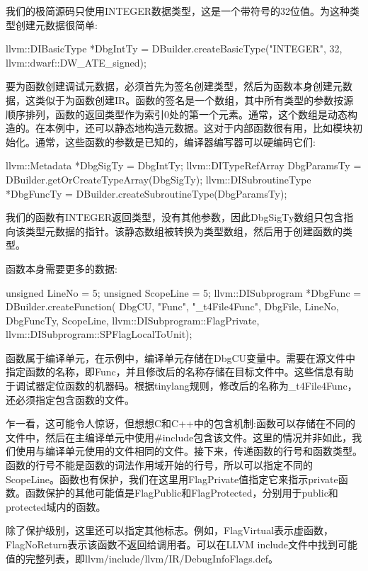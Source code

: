 我们的极简源码只使用INTEGER数据类型，这是一个带符号的32位值。为这种类型创建元数据很简单:

\begin{cpp}
llvm::DIBasicType *DbgIntTy =
    DBuilder.createBasicType("INTEGER", 32,
        llvm::dwarf::DW_ATE_signed);
\end{cpp}

要为函数创建调试元数据，必须首先为签名创建类型，然后为函数本身创建元数据，这类似于为函数创建IR。函数的签名是一个数组，其中所有类型的参数按源顺序排列，函数的返回类型作为索引0处的第一个元素。通常，这个数组是动态构造的。在本例中，还可以静态地构造元数据。这对于内部函数很有用，比如模块初始化。通常，这些函数的参数是已知的，编译器编写器可以硬编码它们:

\begin{cpp}
llvm::Metadata *DbgSigTy = {DbgIntTy};
llvm::DITypeRefArray DbgParamsTy =
            DBuilder.getOrCreateTypeArray(DbgSigTy);
llvm::DISubroutineType *DbgFuncTy =
            DBuilder.createSubroutineType(DbgParamsTy);
\end{cpp}

我们的函数有INTEGER返回类型，没有其他参数，因此DbgSigTy数组只包含指向该类型元数据的指针。该静态数组被转换为类型数组，然后用于创建函数的类型。

函数本身需要更多的数据:

\begin{cpp}
unsigned LineNo = 5;
unsigned ScopeLine = 5;
llvm::DISubprogram *DbgFunc = DBuilder.createFunction(
    DbgCU, "Func", "_t4File4Func", DbgFile, LineNo,
    DbgFuncTy, ScopeLine, llvm::DISubprogram::FlagPrivate,
    llvm::DISubprogram::SPFlagLocalToUnit);
\end{cpp}

函数属于编译单元，在示例中，编译单元存储在DbgCU变量中。需要在源文件中指定函数的名称，即Func，并且修改后的名称存储在目标文件中。这些信息有助于调试器定位函数的机器码。根据tinylang规则，修改后的名称为\_t4File4Func，还必须指定包含函数的文件。

乍一看，这可能令人惊讶，但想想C和C++中的包含机制:函数可以存储在不同的文件中，然后在主编译单元中使用\#include包含该文件。这里的情况并非如此，我们使用与编译单元使用的文件相同的文件。接下来，传递函数的行号和函数类型。函数的行号不能是函数的词法作用域开始的行号，所以可以指定不同的ScopeLine。函数也有保护，我们在这里用FlagPrivate值指定它来指示private函数。函数保护的其他可能值是FlagPublic和FlagProtected，分别用于public和protected域内的函数。

除了保护级别，这里还可以指定其他标志。例如，FlagVirtual表示虚函数，FlagNoReturn表示该函数不返回给调用者。可以在LLVM include文件中找到可能值的完整列表，即llvm/include/llvm/IR/DebugInfoFlags.def。

